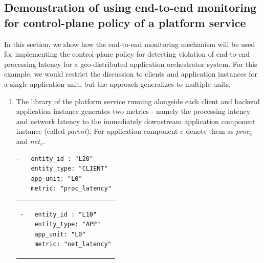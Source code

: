\subsection{Demonstration of using end-to-end monitoring for control-plane policy of a platform service}
In this section, we show how the end-to-end monitoring mechanism will be used for implementing the control-plane policy for detecting violation of end-to-end processing latency for a geo-distributed application orchestrator system. For this example, we would restrict the discussion to clients and application instances for a single application unit, but the approach generalizes to multiple units.
\begin{enumerate}
\item The library of the platform service running alongside each client and backend application instance generates two metrics - namely the processing latency and network latency to the immediately downstream application component instance (called \textit{parent}). For application component $e$ denote them as $proc_e$ and $net_e$.\\
\begin{minipage}{0.45\textwidth}
\begin{verbatim}
-   entity_id : "L20"
    entity_type: "CLIENT"
    app_unit: "L0"
    metric: "proc_latency"
\end{verbatim}
\end{minipage}%
\hfill
\begin{minipage}{0.45\textwidth}
\begin{tabular}{p{\textwidth}}
\begin{verbatim}
-   entity_id : "L10"
    entity_type: "APP"
    app_unit: "L0"
    metric: "net_latency"
\end{verbatim}
\end{tabular}
\end{minipage}


\end{enumerate}
